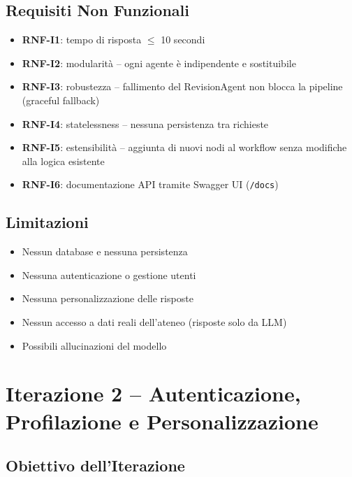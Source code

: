 \documentclass[a4paper,12pt]{report}
\begin{document}
\section{Requisiti Non Funzionali}

\begin{itemize}
    \item \textbf{RNF-I1}: tempo di risposta $\leq$ 10 secondi
    \item \textbf{RNF-I2}: modularità -- ogni agente è indipendente e sostituibile
    \item \textbf{RNF-I3}: robustezza -- fallimento del RevisionAgent non blocca la pipeline (graceful fallback)
    \item \textbf{RNF-I4}: statelessness -- nessuna persistenza tra richieste
    \item \textbf{RNF-I5}: estensibilità -- aggiunta di nuovi nodi al workflow senza modifiche alla logica esistente
    \item \textbf{RNF-I6}: documentazione API tramite Swagger UI (\texttt{/docs})
\end{itemize}

\section{Limitazioni}

\begin{itemize}
    \item Nessun database e nessuna persistenza
    \item Nessuna autenticazione o gestione utenti
    \item Nessuna personalizzazione delle risposte
    \item Nessun accesso a dati reali dell'ateneo (risposte solo da LLM)
    \item Possibili allucinazioni del modello
\end{itemize}


\chapter{Iterazione 2 -- Autenticazione, Profilazione e Personalizzazione}

\section{Obiettivo dell'Iterazione}
\end{document}
